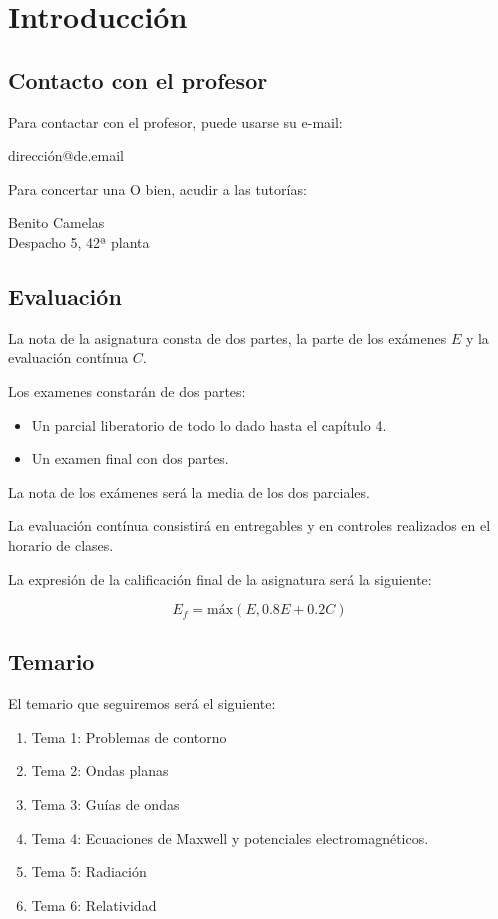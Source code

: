 \documentclass[{../apuntes.tex}]{subfiles}
\begin{document}
\chapter{Introducción}

\section*{Contacto con el profesor}

Para contactar con el profesor, puede usarse su e-mail:

\begin{center}
		dirección@de.email
\end{center}

Para concertar una O bien, acudir a las tutorías:

\begin{center}
	Benito Camelas \\
	Despacho 5, 42ª planta
\end{center}

\section*{Evaluación}

La nota de la asignatura consta de dos partes, la parte de los exámenes $E$ y la evaluación contínua $C$.

Los examenes constarán de dos partes:

\begin{itemize}
	\item Un parcial liberatorio de todo lo dado hasta el capítulo 4.
	\item Un examen final con dos partes.
\end{itemize}

La nota de los exámenes será la media de los dos parciales.

La evaluación contínua consistirá en entregables y en controles realizados en el horario de clases.

La expresión de la calificación final de la asignatura será la siguiente:

\[
E_f = \text{máx} \left( E , 0.8 E + 0.2 C \right)
\]

\section*{Temario}

El temario que seguiremos será el siguiente:

\begin{enumerate}
	\item Tema 1: Problemas de contorno
	\item Tema 2: Ondas planas
	\item Tema 3: Guías de ondas
	\item Tema 4: Ecuaciones de Maxwell y potenciales electromagnéticos.
	\item Tema 5: Radiación
	\item Tema 6: Relatividad
\end{enumerate}
\end{document}
